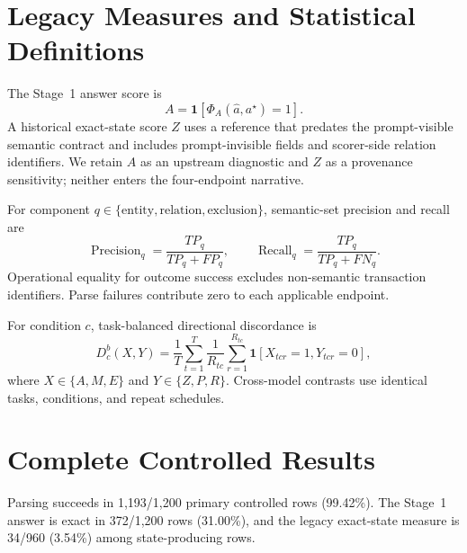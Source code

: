 \documentclass[11pt]{article}
\newcommand{\Rsupport}{R}
\newcommand{\Pstrict}{P}
\newcommand{\Maction}{M}
\newcommand{\Eoutcome}{E}
\begin{document}
\section{Legacy Measures and Statistical Definitions}
\label{app:legacy}

The Stage~1 answer score is
\begin{equation}
A=\mathbf{1}[\Phi_A(\hat a,a^\star)=1].
\end{equation}
A historical exact-state score \(Z\) uses a reference that predates the prompt-visible semantic contract and includes prompt-invisible fields and scorer-side relation identifiers. We retain \(A\) as an upstream diagnostic and \(Z\) as a provenance sensitivity; neither enters the four-endpoint narrative.

For component \(q\in\{\text{entity},\text{relation},\text{exclusion}\}\), semantic-set precision and recall are
\begin{equation}
\operatorname{Precision}_q=\frac{TP_q}{TP_q+FP_q},\qquad
\operatorname{Recall}_q=\frac{TP_q}{TP_q+FN_q}.
\end{equation}
Operational equality for outcome success excludes non-semantic transaction identifiers. Parse failures contribute zero to each applicable endpoint.

For condition \(c\), task-balanced directional discordance is
\begin{equation}
D_c^{b}(X,Y)=\frac{1}{T}\sum_{t=1}^{T}\frac{1}{R_{tc}}
\sum_{r=1}^{R_{tc}}\mathbf{1}[X_{tcr}=1,Y_{tcr}=0],
\end{equation}
where \(X\in\{A,\Maction,\Eoutcome\}\) and \(Y\in\{Z,\Pstrict,\Rsupport\}\). Cross-model contrasts use identical tasks, conditions, and repeat schedules.

\section{Complete Controlled Results}
\label{app:controlled}

Parsing succeeds in 1,193/1,200 primary controlled rows (99.42\%). The Stage~1 answer is exact in 372/1,200 rows (31.00\%), and the legacy exact-state measure is 34/960 (3.54\%) among state-producing rows.
\end{document}
